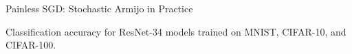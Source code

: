 \documentclass[notheorems]{beamer}
\begin{document}
    \begin{frame}{Painless SGD: Stochastic Armijo in Practice}

        {\large Classification accuracy for ResNet-34 models trained on MNIST, CIFAR-10, and CIFAR-100. }\vspace{0.5em}

        \begin{figure}
            \centering
            \vspace{0.5em}
        \end{figure}

    \end{frame}
\end{document}

